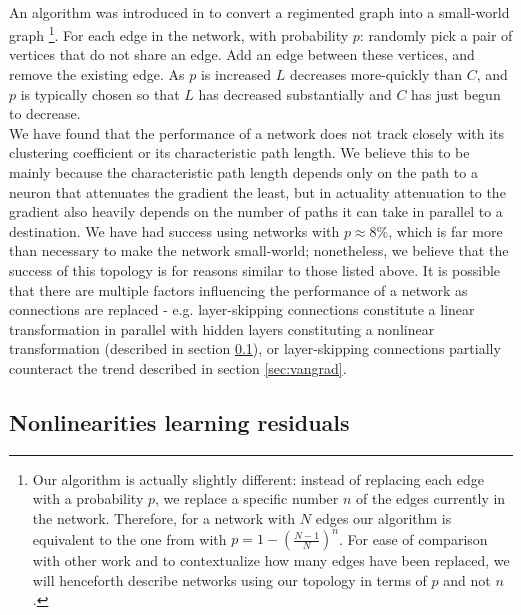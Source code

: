 \documentclass{article}
\newcommand{\npar}{\\\indent}
\begin{document}
\npar
An algorithm was introduced in \cite{watts98} to convert a regimented graph into a small-world graph
\footnote{Our algorithm is actually slightly different: instead of replacing each edge with a probability $p$, we replace a specific number $n$ of the edges currently in the network. Therefore, for a network with $N$ edges our algorithm is equivalent to the one from \cite{watts98} with $p=1-(\frac{N-1}{N})^n$. For ease of comparison with other work and to contextualize how many edges have been replaced, we will henceforth describe networks using our topology in terms of $p$ and not $n$.}.
 For each edge in the network, with probability $p$: randomly pick a pair of vertices that do not share an edge. Add an edge between these vertices, and remove the existing edge. As $p$ is increased $L$ decreases more-quickly than $C$, and $p$ is typically chosen so that $L$ has decreased substantially and $C$ has just begun to decrease.
\npar
We have found that the performance of a network does not track closely with its clustering coefficient or its characteristic path length. We believe this to be mainly because the characteristic path length depends only on the path to a neuron that attenuates the gradient the least, but in actuality attenuation to the gradient also heavily depends on the number of paths it can take in parallel to a destination. We have had success using networks with $p\approx 8\%$, which is far more than necessary to make the network small-world; nonetheless, we believe that the success of this topology is for reasons similar to those listed above. It is possible that there are multiple factors influencing the performance of a network as connections are replaced - e.g. layer-skipping connections constitute a linear transformation in parallel with hidden layers constituting a nonlinear transformation (described in section \ref{sec:residuals}), or layer-skipping connections partially counteract the trend described in section \ref{sec:vangrad}.

\subsection{Nonlinearities learning residuals}
\label{sec:residuals}
\end{document}
